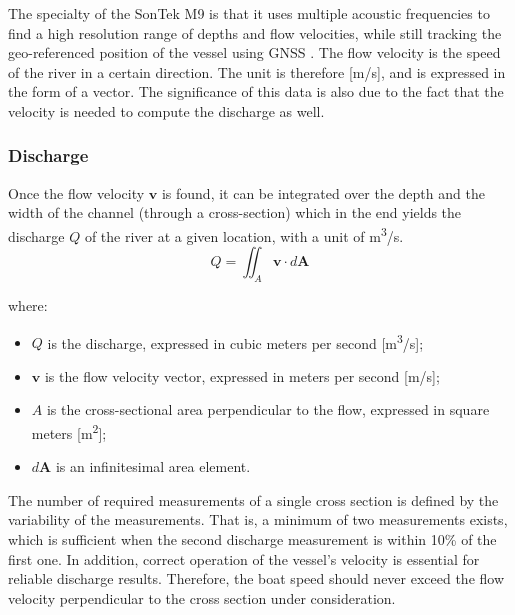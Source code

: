The specialty of the SonTek M9 is that it uses multiple acoustic frequencies to find a high resolution range of depths and flow velocities, while still tracking the geo-referenced position of the vessel using GNSS \autocite{ysiinc.SonTekM9}. The flow velocity is the speed of the river in a certain direction. The unit is therefore  [m/s], and is expressed in the form of a vector. The significance of this data is also due to the fact that the velocity is needed to compute the discharge as well.

\subsubsection{Discharge}
Once the flow velocity \(\mathbf{v}\) is found, it can be integrated over the depth and the width of the channel (through a cross-section) which in the end yields the discharge \(Q\) of the river at a given location, with a unit of \si{\cubic\metre}/s.
\begin{equation}
    Q = \iint_A \mathbf{v} \cdot d\mathbf{A}
    \label{eq:discharge_integration}
\end{equation}

\noindent where:
\begin{itemize}
    \item \(Q\) is the discharge, expressed in cubic meters per second [m\textsuperscript{3}/s];
    \item \(\mathbf{v}\) is the flow velocity vector, expressed in meters per second [m/s];
    \item \(A\) is the cross-sectional area perpendicular to the flow, expressed in square meters [m\textsuperscript{2}];
    \item \(d\mathbf{A}\) is an infinitesimal area element.
\end{itemize}

The number of required measurements of a single cross section is defined by the variability of the measurements. That is, a minimum of two measurements exists, which is sufficient when the second discharge measurement is within 10\% of the first one. In addition, correct operation of the vessel's velocity is essential for reliable discharge results. Therefore, the boat speed should never exceed the flow velocity perpendicular to the cross section under consideration. 






